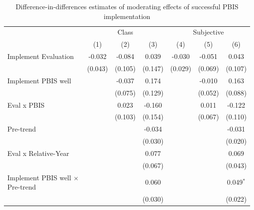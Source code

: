 
\begin{table}[!htbp]
   \caption{\label{tab:pbis} Difference-in-differences estimates of moderating effects of successful PBIS implementation}
   \bigskip
   \centering
   \begin{tabular}{lcccccc}
      \toprule
       & \multicolumn{3}{c}{Class} & \multicolumn{3}{c}{Subjective}\\
                                              & (1)           & (2)           & (3)           & (4)           & (5)           & (6)\\  
      \midrule 
      Implement Evaluation                    & -0.032        & -0.084        & 0.039         & -0.030        & -0.051        & 0.043\\   
                                              & (0.043)       & (0.105)       & (0.147)       & (0.029)       & (0.069)       & (0.107)\\   
      Implement PBIS well                     &               & -0.037        & 0.174         &               & -0.010        & 0.163\\   
                                              &               & (0.075)       & (0.129)       &               & (0.052)       & (0.088)\\   
      Eval x PBIS                             &               & 0.023         & -0.160        &               & 0.011         & -0.122\\   
                                              &               & (0.103)       & (0.154)       &               & (0.067)       & (0.110)\\   
      Pre-trend                               &               &               & -0.034        &               &               & -0.031\\   
                                              &               &               & (0.030)       &               &               & (0.020)\\   
      Eval x Relative-Year                    &               &               & 0.077         &               &               & 0.069\\   
                                              &               &               & (0.067)       &               &               & (0.043)\\   
      Implement PBIS well $\times$ Pre-trend  &               &               & 0.060         &               &               & 0.049$^{*}$\\   
                                              &               &               & (0.030)       &               &               & (0.022)\\   

\end{tabular}
\end{table}
